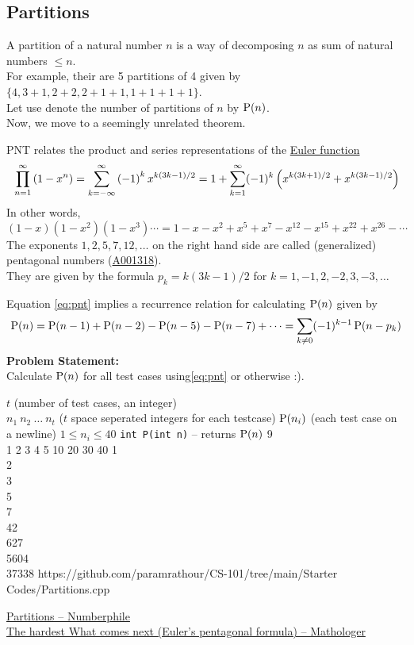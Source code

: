 \documentclass[../../Problems]{subfiles}
\begin{document}
\subsection{Partitions}
A partition of a natural number $n$ is a way of decomposing $n$ as sum of natural numbers $\leq n$.\\
For example, their are 5 partitions of 4 given by $\{4, 3+1, 2+2, 2+1+1, 1+1+1+1\}$.\\
Let use denote the number of partitions of $n$ by $\operatorname{P}(n)$.\\
Now, we move to a seemingly unrelated theorem.
\begin{theorem}
	PNT relates the product and series representations of the \href{https://en.wikipedia.org/wiki
	/Euler_function}{Euler function}
	\begin{equation}{\label{eq:pnt}}
		\prod_{n=1}^{\infty}\left(1-x^{n}\right)=\sum_{k=-\infty }^{\infty }\left(-1\right)^{k}x^{k\left(3k-1\right)/2}=1+\sum _{k=1}^{\infty }(-1)^{k}\left(x^{k(3k+1)/2}+x^{k(3k-1)/2}\right)
	\end{equation}
	In other words,
	\begin{equation*}
		(1-x)(1-x^{2})(1-x^{3})\cdots =1-x-x^{2}+x^{5}+x^{7}-x^{12}-x^{15}+x^{22}+x^{26}-\cdots
	\end{equation*}
	The exponents $1, 2, 5, 7, 12,\ldots$ on the right hand side are called (generalized) pentagonal numbers (\href{https://oeis.org/A001318}{A001318}).\\
	They are given by the formula $p_k = k(3k - 1)/2$ for $k = 1, -1, 2, -2, 3,-3,\ldots$
\end{theorem}
Equation \ref{eq:pnt} implies a recurrence relation for calculating $\operatorname{P}(n)$ given by
\begin{equation}
	\operatorname{P}(n)=\operatorname{P}(n-1)+\operatorname{P}(n-2)-\operatorname{P}(n-5)-\operatorname{P}(n-7)+\cdots = \sum_{k\neq 0}(-1)^{k-1}\operatorname{P}(n-p_{k})
\end{equation}
\textbf{Problem Statement:}\\
Calculate $\operatorname{P}(n)$ for all test cases using\ref{eq:pnt} or otherwise :).
\begin{testcasesFunction}
	{$t$ \hfill(number of test cases, an integer)\\
	$n_1\ n_2\ \ldots\ n_t$ \hfill($t$ space seperated integers for each testcase)}
	{$\operatorname{P}(n_i)$ \hfill(each test case on a newline)}
	{$1 \leq n_i \leq 40$}
	{\texttt{int P(int n)} -- returns $\operatorname{P}(n)$ }%
	{9\\1 2 3 4 5 10 20 30 40}
	{1\\2\\3\\5\\7\\42\\627\\5604\\37338}
	{https://github.com/paramrathour/CS-101/tree/main/Starter Codes/Partitions.cpp}
\end{testcasesFunction}
\begin{funvideo}
\href{https://youtu.be/NjCIq58rZ8I}{Partitions -- Numberphile}\\
\href{https://youtu.be/iJ8pnCO0nTY}{The hardest What comes next (Euler's pentagonal formula) -- Mathologer}
\end{funvideo}
\end{document}
